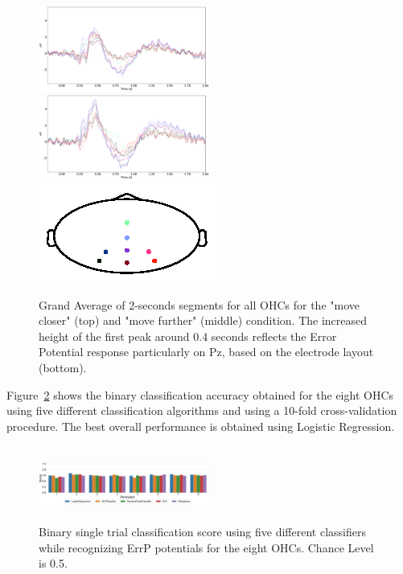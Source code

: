 \documentclass[journal]{IEEEtran}
\begin{document}
{{\begin{figure}[ht]
    \centering
    \includegraphics[width=0.5\textwidth]{revisedimages/avg_closer.eps}
    \includegraphics[width=0.5\textwidth]{revisedimages/avg_further.eps}
        \includegraphics[scale=1.0]{revisedimages/electrodes.png}
    \caption{Grand Average of 2-seconds segments for all OHCs for the "move closer" (top) and "move further" (middle) condition.  The increased height of the first peak around 0.4 seconds reflects the Error Potential response particularly on Pz, based on the electrode layout (bottom).}
    \label{fig:classifiers}
\end{figure}


Figure~\ref{fig:classifiers} shows the binary classification accuracy obtained for the eight OHCs using five different classification algorithms and using a 10-fold cross-validation procedure.  The best overall performance is obtained using Logistic Regression.  

\begin{figure}[ht]
    \centering
    \includegraphics[width=0.5\textwidth,height=70pt]{revisedimages/cross_val.eps}
    \caption{Binary single trial classification score using five different classifiers while recognizing ErrP potentials for the eight OHCs.   Chance Level is 0.5.}
    \label{fig:classifiers}
\end{figure}


}}
\end{document}
